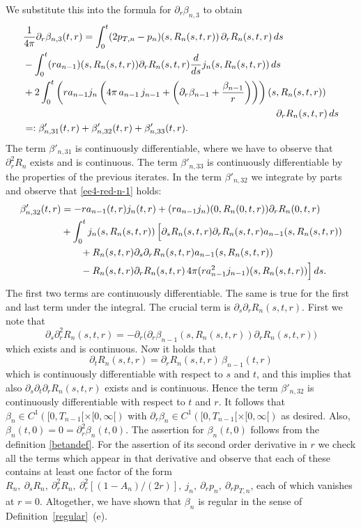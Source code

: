 \documentclass[11pt]{article}
\begin{document}
We substitute this into the formula for $\partial_r \beta_{n,3}$ to obtain
\begin{align}\label{drbeta_n3}
  &
  \frac{1}{4\pi}\partial_r \beta_{n,3}(t,r) =
  \int_0^t (2 p_{T,n}-p_n)(s,R_n(s,t,r))\, \partial_r R_n(s,t,r)\, ds \notag\\
  &
  {}- \int_0^t (r a_{n-1})(s,R_n(s,t,r))  \partial_r R_n(s,t,r) \frac{d}{ds}
  j_n(s,R_n(s,t,r))\, ds\notag \\
  &
  {}+ 2 \int_0^t \left(r a_{n-1} j_n
  \left(4\pi \,a_{n-1}\, j_{n-1} +
  \left(\partial_r\beta_{n-1}+\frac{\beta_{n-1}}{r}\right)
  \right)\right) (s,R_n(s,t,r))\,\notag\\
  &\qquad\qquad\qquad\qquad\qquad\qquad\qquad\qquad\qquad\qquad
  \qquad\qquad\qquad
  \partial_r R_n(s,t,r)\,ds \notag\\
  &=:
  \beta'_{n,31}(t,r) + \beta'_{n,32}(t,r) + \beta'_{n,33}(t,r) .
\end{align}
The term $\beta'_{n,31}$ is continuously differentiable, where we have to
observe that $\partial_r^2 R_n$ exists and is continuous.
The term $\beta'_{n,33}$ is continuously differentiable by the properties of the
previous iterates. In the term $\beta'_{n,32}$ we integrate by parts
and observe that \eqref{ee4-red-n-1} holds:
\begin{align}\label{drbeta_n3crit}
  \beta'_{n,32}(t,r)
  &=
  - r a_{n-1}(t,r) j_n(t,r) +(r a_{n-1} j_n)(0,R_n(0,t,r))
  \partial_r R_n(0,t,r)\notag\\
  &
  +\int_0^t j_n(s,R_n(s,t,r))\,
  \Bigl[\partial_s R_n(s,t,r)\partial_r R_n(s,t,r) a_{n-1}(s,R_n(s,t,r)) \notag\\
  &
  \qquad + R_n(s,t,r)
  \partial_s\partial_r R_n(s,t,r) a_{n-1}(s,R_n(s,t,r)) \notag\\
  &
  \qquad - R_n(s,t,r) \partial_r R_n(s,t,r)
  \, 4 \pi (r a^2_{n-1} j_{n-1})(s,R_n(s,t,r))
  \Bigr]\, ds.
\end{align}
The first two terms are continuously differentiable.
The same is true for the first and last term under the integral.
The crucial term is $\partial_s\partial_r R_n(s,t,r)$.
First we note that
\[
\partial_s\partial_r^2 R_n(s,t,r) =
- \partial_r\bigl(\partial_r \beta_{n-1}(s,R_n(s,t,r))\partial_r R_n(s,t,r)\bigr)
\]
which exists and is continuous.
Now it holds that
\[
\partial_t R_n(s,t,r) = \partial_r R_n(s,t,r)\, \beta_{n-1}(t,r)
\]
which is continuously differentiable with respect to $s$ and $t$,
and this implies that also $\partial_s\partial_t\partial_r R_n(s,t,r)$
exists and is continuous.
Hence the term $\beta'_{n,32}$ is continuously differentiable with
respect to $t$ and $r$.
It follows that $\beta_n \in C^1([0,T_{n-1}[\times [0,\infty[)$ with
$\partial_r \beta_n \in C^1([0,T_{n-1}[\times [0,\infty[)$ as desired.
Also, $\beta_n(t,0) = 0 = \partial_r^2 \beta_n(t,0)$.
The assertion for $\beta_n(t,0)$ follows from the definition
\eqref{betandef}. For the assertion of its second order derivative
in $r$ we check all the terms which appear in that derivative and
observe that each of these contains at least one factor of the form
$R_n,\ \partial_s R_n,\ \partial_r^2 R_n,\ \partial_r^2[(1-A_n)/(2r)],\ j_n,
\ \partial_r p_n,\ \partial_r p_{T,n}$,
each of which vanishes at $r=0$.
Altogether, we have shown that $\beta_n$ is regular in the sense of
Definition~\ref{regular}~(e).
%
%
\end{document}
